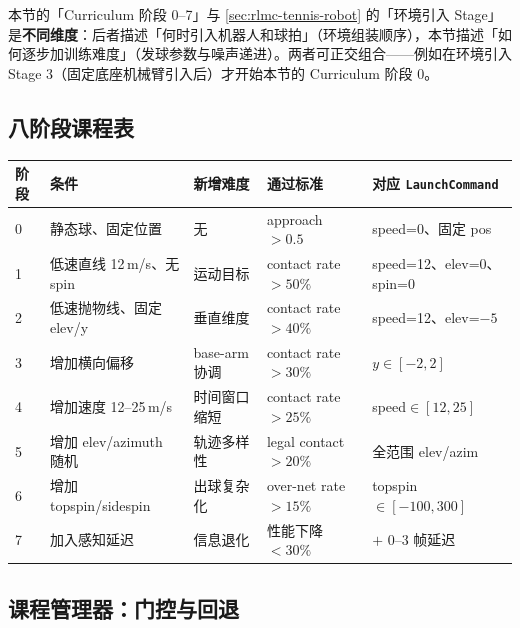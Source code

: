 \begin{note}
本节的「Curriculum 阶段 0--7」与 \cref{sec:rlmc-tennis-robot} 的「环境引入 Stage」是\textbf{不同维度}：后者描述「何时引入机器人和球拍」（环境组装顺序），本节描述「如何逐步加训练难度」（发球参数与噪声递进）。两者可正交组合——例如在环境引入 Stage 3（固定底座机械臂引入后）才开始本节的 Curriculum 阶段 0。
\end{note}

\subsection{八阶段课程表}

\begin{center}
\small
\begin{tabular}{@{}llllp{3.0cm}@{}}
\toprule
阶段 & 条件 & 新增难度 & 通过标准 & 对应 \texttt{LaunchCommand} \\
\midrule
0 & 静态球、固定位置 & 无 & approach $>0.5$ & speed=0、固定 pos \\
1 & 低速直线 12\,m/s、无 spin & 运动目标 & contact rate $>50\%$ & speed=12、elev=0、spin=0 \\
2 & 低速抛物线、固定 elev/y & 垂直维度 & contact rate $>40\%$ & speed=12、elev=$-5$ \\
3 & 增加横向偏移 & base-arm 协调 & contact rate $>30\%$ & $y\in[-2,2]$ \\
4 & 增加速度 12--25\,m/s & 时间窗口缩短 & contact rate $>25\%$ & speed$\in[12,25]$ \\
5 & 增加 elev/azimuth 随机 & 轨迹多样性 & legal contact $>20\%$ & 全范围 elev/azim \\
6 & 增加 topspin/sidespin & 出球复杂化 & over-net rate $>15\%$ & topspin$\in[-100,300]$ \\
7 & 加入感知延迟 & 信息退化 & 性能下降 $<30\%$ & $+$ 0--3 帧延迟 \\
\bottomrule
\end{tabular}
\end{center}

\subsection{课程管理器：门控与回退}

